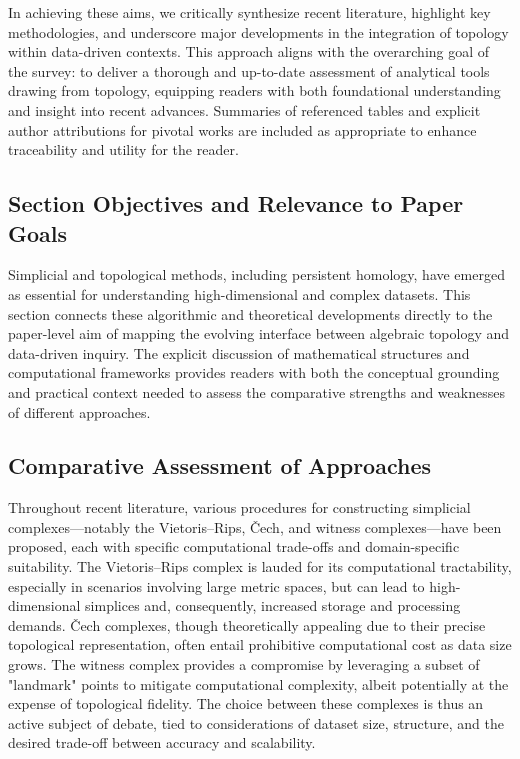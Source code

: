 \documentclass[sigconf]{acmart}
\begin{document}
In achieving these aims, we critically synthesize recent literature, highlight key methodologies, and underscore major developments in the integration of topology within data-driven contexts. This approach aligns with the overarching goal of the survey: to deliver a thorough and up-to-date assessment of analytical tools drawing from topology, equipping readers with both foundational understanding and insight into recent advances. Summaries of referenced tables and explicit author attributions for pivotal works are included as appropriate to enhance traceability and utility for the reader.

\subsection{Section Objectives and Relevance to Paper Goals}

Simplicial and topological methods, including persistent homology, have emerged as essential for understanding high-dimensional and complex datasets. This section connects these algorithmic and theoretical developments directly to the paper-level aim of mapping the evolving interface between algebraic topology and data-driven inquiry. The explicit discussion of mathematical structures and computational frameworks provides readers with both the conceptual grounding and practical context needed to assess the comparative strengths and weaknesses of different approaches.

\subsection{Comparative Assessment of Approaches}

Throughout recent literature, various procedures for constructing simplicial complexes---notably the Vietoris–Rips, Čech, and witness complexes---have been proposed, each with specific computational trade-offs and domain-specific suitability. The Vietoris–Rips complex is lauded for its computational tractability, especially in scenarios involving large metric spaces, but can lead to high-dimensional simplices and, consequently, increased storage and processing demands. Čech complexes, though theoretically appealing due to their precise topological representation, often entail prohibitive computational cost as data size grows. The witness complex provides a compromise by leveraging a subset of "landmark" points to mitigate computational complexity, albeit potentially at the expense of topological fidelity. The choice between these complexes is thus an active subject of debate, tied to considerations of dataset size, structure, and the desired trade-off between accuracy and scalability.
\end{document}
